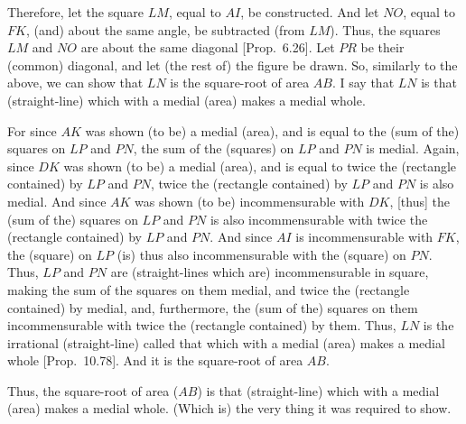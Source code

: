 \begin{Parallel}{}{}
{Therefore, let the square $LM$, equal to $AI$, be constructed.
And let $NO$, equal to $FK$, (and) about the same angle, be subtracted (from $LM$). Thus, the squares $LM$ and $NO$ are about the
same diagonal [Prop.~6.26]. 
Let $PR$ be their (common) diagonal, and let (the rest of) the figure be drawn.
So, similarly to the above, we can show that $LN$ is the square-root of
area $AB$. I say that $LN$ is  that (straight-line) which with a medial (area) makes a medial whole.

For since $AK$ was shown (to be) a medial (area), and is equal to the
(sum of the) squares on $LP$ and $PN$, the sum of the (squares) on
$LP$ and $PN$ is medial. Again, since $DK$ was shown (to
be) a medial (area), and is equal to twice the (rectangle contained)
by $LP$ and $PN$, twice the (rectangle contained) by $LP$ and
$PN$ is also medial. And since $AK$ was shown (to be) incommensurable
with $DK$, [thus] the (sum of the) squares on $LP$ and $PN$ is also
incommensurable with twice the (rectangle contained) by $LP$ and $PN$.
And since $AI$ is incommensurable with $FK$, the (square) on
$LP$ (is) thus also incommensurable with the (square) on $PN$. Thus, $LP$ and $PN$
are (straight-lines which are) incommensurable in square, making the sum of the squares on them
medial, and twice the (rectangle contained) by  medial, and, furthermore,
the (sum of the) squares on them incommensurable with twice the
(rectangle contained) by them. Thus, $LN$ is the irrational (straight-line) called  that  which with a medial (area) makes a medial whole [Prop.~10.78]. And it is the square-root of area $AB$.

Thus, the square-root of area ($AB$) is that (straight-line) which with a medial (area) makes a medial whole. (Which is) the very thing it was required to show.\\}
\end{Parallel}

